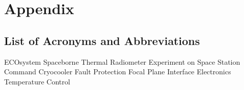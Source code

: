 %
%

\section{Appendix}
\label{app:acron}

\subsection{List of Acronyms and Abbreviations}

\begin{acronym}[ECOSTRESS]
        {ECOsystem Spaceborne Thermal Radiometer Experiment on
                        Space Station}
              {Command}
             {Cryocooler}
               {Fault Protection}
             {Focal Plane Interface Electronics}
          {Temperature Control}
\end{acronym}
